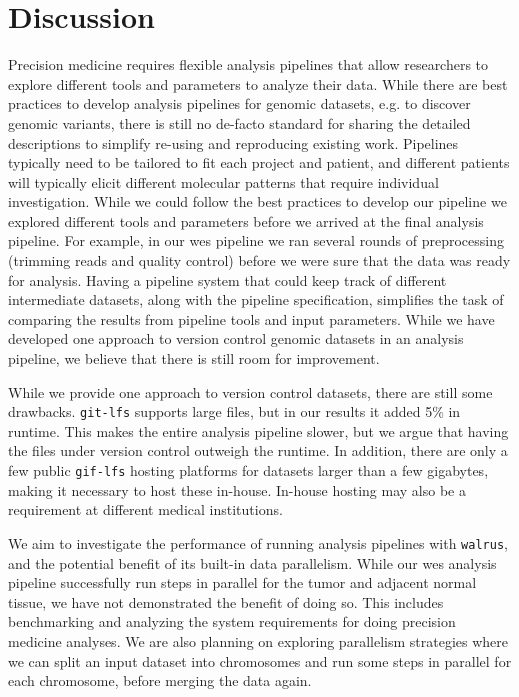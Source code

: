 \section{Discussion}
Precision medicine requires flexible analysis pipelines that allow researchers
to explore different tools and parameters to analyze their data.  While there
are best practices to develop analysis pipelines for genomic datasets, e.g. to
discover genomic variants, there is still no de-facto standard for sharing the
detailed descriptions to simplify re-using and reproducing existing work.
Pipelines typically need to be tailored to fit each project and patient, and
different patients will typically elicit different molecular patterns that
require individual investigation. While we could follow the best practices to
develop our pipeline we explored different tools and parameters before we
arrived at the final analysis pipeline.  For example, in our \gls{wes} pipeline
we ran several rounds of preprocessing (trimming reads and quality control)
before we were sure that the data was ready for analysis. Having a pipeline
system that could keep track of different intermediate datasets, along with the
pipeline specification, simplifies the task of comparing the results from
pipeline tools and input parameters. While we have developed one approach to
version control genomic datasets in an analysis pipeline, we believe that there
is still room for improvement. 

While we provide one approach to version control datasets, there are still some
drawbacks. \texttt{git-lfs} supports large files, but in our results it added
5\% in runtime.  This makes the entire analysis pipeline slower, but we argue
that having the files under version control outweigh the runtime. In addition,
there are only a few public \texttt{gif-lfs} hosting platforms for datasets
larger than a few gigabytes, making it necessary to host these in-house.
In-house hosting may also be a requirement at different medical institutions.  

We aim to investigate the performance of running analysis pipelines with
\texttt{walrus}, and the potential benefit of its built-in data parallelism.
While our \gls{wes} analysis pipeline successfully run steps in parallel for the
tumor and adjacent normal tissue, we have not demonstrated the benefit
of doing so. This includes benchmarking and analyzing the system requirements
for doing precision medicine analyses.  We are also planning on exploring
parallelism strategies where we can split an input dataset into chromosomes and
run some steps in parallel for each chromosome, before merging the data again. 

